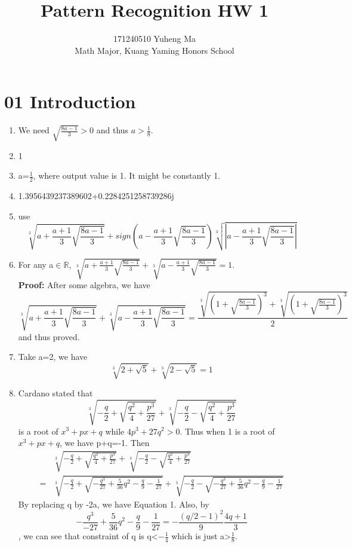 \documentclass[10pt, oneside]{article}
\title{
Pattern Recognition HW 1
}
\author{171240510 Yuheng Ma\\[0.3cm]{Math Major, Kuang Yaming Honors School}}
\date
\begin{document}
\maketitle

\vspace{.25in}
\section{01 Introduction}
\begin{enumerate}
	\item We need $\sqrt{\frac{8a-1}{3}}>0$ and thus $a>\frac{1}{8}$.
	\item 1
	\item a=$\frac{1}{2}$, where output value is 1. It might be constantly 1.
	\item 1.3956439237389602+0.2284251258739286j
	\item use $$\sqrt[3]{a+\frac{a+1}{3} \sqrt{\frac{8 a-1}{3}}}+sign(a-\frac{a+1}{3} \sqrt{\frac{8 a-1}{3}})\sqrt[3]{|a-\frac{a+1}{3} \sqrt{\frac{8 a-1}{3}}|}$$
	\item For any a$\in \mathbb{R}$, $\sqrt[3]{a+\frac{a+1}{3} \sqrt{\frac{8 a-1}{3}}}+\sqrt[3]{a-\frac{a+1}{3} \sqrt{\frac{8 a-1}{3}}}=1$.\\\textbf{Proof:} After some algebra, we have
	$$
	\sqrt[3]{a+\frac{a+1}{3} \sqrt{\frac{8 a-1}{3}}}+\sqrt[3]{a-\frac{a+1}{3} \sqrt{\frac{8 a-1}{3}}}=\frac{\sqrt[3]{(1+\sqrt{\frac{8a-1}{3}})^3}+\sqrt[3]{(1+\sqrt{\frac{8a-1}{3}})^3}}{2}
	$$
	and thus proved.
	\item Take a=2, we have $$\sqrt[3]{2+\sqrt{5}}+\sqrt[3]{2-\sqrt{5}}=1$$
	\item Cardano stated that $$
	\sqrt[3]{-\frac{q}{2}+\sqrt{\frac{q^{2}}{4}+\frac{p^{3}}{27}}}+\sqrt[3]{-\frac{q}{2}-\sqrt{\frac{q^{2}}{4}+\frac{p^{3}}{27}}}
	$$
	is a root of $x^3+px+q$ while $4 p^{3}+27 q^{2}>0$. Thus when 1 is a root of $x^3+px+q$, we have p+q=-1. Then$$
	\begin{aligned}
	&\sqrt[3]{-\frac{q}{2}+\sqrt{\frac{q^{2}}{4}+\frac{p^{3}}{27}}}+\sqrt[3]{-\frac{q}{2}-\sqrt{\frac{q^{2}}{4}+\frac{p^{3}}{27}}}\\
	=&\sqrt[3]{-\frac{q}{2}+\sqrt{-\frac{q^{3}}{27}+\frac{5}{36} q^{2}-\frac{q}{9}-\frac{1}{27}}}+\sqrt[3]{-\frac{q}{2}-\sqrt{-\frac{q^{3}}{27}+\frac{5}{36} q^{2}-\frac{q}{9}-\frac{1}{27}}}
	\end{aligned}
	$$
	By replacing q by -2a, we have Equation 1. Also, by $$-\frac{q^{3}}{-27}+\frac{5}{36} q^{2}-\frac{q}{9}-\frac{1}{27}=-\frac{(q/2-1)^2}{9}\frac{4q+1}{3}$$, we can see that constraint of q is q<$-\frac{1}{4}$ which is just a>$\frac{1}{8}$.
\end{enumerate}
\end{document}
